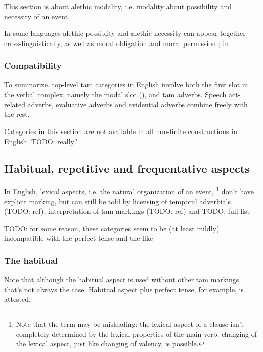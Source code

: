 \documentclass[UTF8, a4paper, oneside, scheme=plain, 12pt]{ctexbook}
\newcommand*{\citepage}[1]{p.~{#1}}
\begin{document}
This section is about alethic modality, i.e. modality about possibility and necessity of an event.

In some languages alethic possiblity and alethic necessity can appear together cross-linguistically,
as well as moral obligation and moral permission
\citep[\citepage{80}]{cinque1999adverbs};
in 


\begin{exe}
    \ex 
\end{exe}


\subsubsection{Compatibility}

To summarize, top-level \ac{tam} categories in English 
involve both the first slot in the verbal complex,
namely the modal slot
(),
and \ac{tam} adverbs.
Speech act-related adverbs, evaluative adverbs 
and evidential adverbs combine freely with the rest.

Categories in this section are not available 
in all non-finite constructions in English. TODO: really?

\subsection{Habitual, repetitive and frequentative aspects}

In English, lexical aspects, i.e. the natural organization of an event,%
\footnote{
    Note that the term may be misleading:
    the lexical aspect of a clause 
    isn't completely determined by the lexical properties of the main verb;
    changing of the lexical aspect, just like changing of valency, is possible.
}
don't have explicit marking, 
but can still be told by licensing of temporal adverbials (TODO: ref),
interpretation of \acs{tam} markings (TODO: ref) and TODO: full list

TODO: for some reason, these categories seem to be (at least mildly) incompatible with the perfect tense and the like

\subsubsection{The habitual}

Note that although the habitual aspect is used without other \ac{tam} markings, 
that's not always the case. 
Habitual aspect plus perfect tense, for example, 
is attested. 
\end{document}
